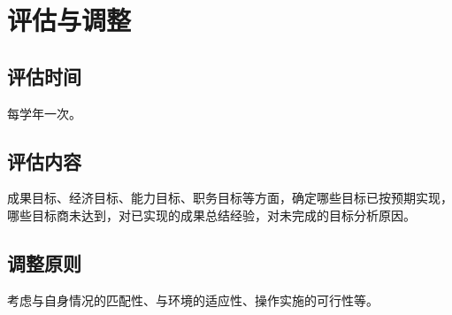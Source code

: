 \documentclass{article}
\begin{document}
\section{评估与调整}
\par 
\subsection{评估时间}
每学年一次。\par
\subsection{评估内容}
成果目标、经济目标、能力目标、职务目标等方面，确定哪些目标已按预期实现，哪些目标商未达到，对已实现的成果总结经验，对未完成的目标分析原因。\par
\subsection{调整原则}
考虑与自身情况的匹配性、与环境的适应性、操作实施的可行性等。\par
\end{document}
